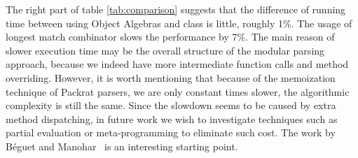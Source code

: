The right part of table \ref{tab:comparison} suggests that the difference of running time between
using Object Algebras and class is little, roughly 1\%.
The usage of longest match combinator slows the performance by 7\%. The main reason of slower
execution time may be the overall structure of the modular parsing approach, because we indeed have
more intermediate function calls and method overriding. However, it is worth mentioning that
because of the memoization technique of Packrat parsers, we are only constant times
slower, the algorithmic complexity is still the same.
Since the slowdown seems to be caused by extra method
dispatching, in future work we wish to investigate techniques such as 
partial evaluation or meta-programming to eliminate such cost. The
work by B{\'e}guet and Manohar~\cite{Beguet:2014} is an interesting starting point.
